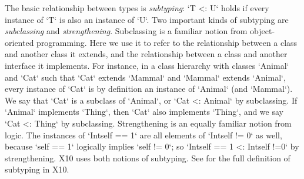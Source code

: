 The basic relationship between types is {\em subtyping}: \xcd`T <: U`
holds if every instance of \xcd`T` is also an instance of \xcd`U`. Two
important kinds of subtyping are {\em subclassing} and {\em
  strengthening}. Subclassing is a familiar notion from
object-oriented programming. Here we use it to refer to the
relationship between a class and another class it extends, and the
relationship between a class and another interface it implements. For
instance, in a class hierarchy with classes \xcd`Animal` and \xcd`Cat`
such that \xcd`Cat` extends \xcd`Mammal` and \xcd`Mammal` extends
\xcd`Animal`, every instance of \xcd`Cat` is by definition an instance
of \xcd`Animal` (and \xcd`Mammal`). We say that \xcd`Cat` is a
subclass of \xcd`Animal`, or \xcd`Cat <: Animal` by subclassing. If
\xcd`Animal` implements \xcd`Thing`, then \xcd`Cat` also implements
\xcd`Thing`, and we say \xcd`Cat <: Thing` by subclassing.
Strengthening is an equally familiar notion from logic.  The instances
of \xcd`Int{self == 1}` are all elements of \xcd`Int{self != 0}` as well,
because \xcd`self == 1` logically implies \xcd`self != 0`; so 
\xcd`Int{self  == 1} <: Int{self !=0}` by strengthening.  X10 uses both notions
of subtyping.  See  for the full definition
of subtyping in X10.

